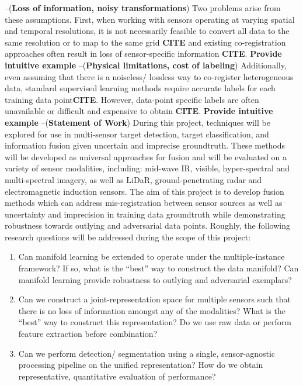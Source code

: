 \newline \vspace{1cm} \noindent --(\textbf{Loss of information, noisy transformations}) \newline
Two problems arise from these assumptions.  First, when working with sensors operating at varying spatial and temporal resolutions, it is not necessarily feasible to convert all data to the same resolution or to map to the same grid \textbf{CITE} and existing co-registration approaches often result in loss of sensor-specific information \textbf{CITE}.  \textbf{Provide intuitive example}   
\newline 
\vspace{1cm}\noindent --(\textbf{Physical limitations, cost of labeling}) \newline
Additionally, even assuming that there is a noiseless/ lossless way to co-register heterogeneous data, standard supervised learning methods require accurate labels for each training data point\textbf{CITE}.  However, data-point specific labels are often unavailable or difficult and expensive to obtain \textbf{CITE}. \textbf{Provide intuitive example} 
\newline
\vspace{1cm}\noindent --(\textbf{Statement of Work}) \newline
During this project, techniques will be explored for use in multi-sensor target detection, target classification, and information fusion given uncertain and imprecise groundtruth.  These methods will be developed as universal approaches for fusion and will be evaluated on a variety of sensor modalities, including: mid-wave IR, visible, hyper-spectral and multi-spectral imagery, as well as LiDaR, ground-penetrating radar and electromagnetic induction sensors.  The aim of this project is to develop fusion methods which can address mis-registration between sensor sources as well as uncertainty and imprecision in training data groundtruth while demonstrating robustness towards outlying and adversarial data points. Roughly, the following research questions will be addressed during the scope of this project:
\begin{enumerate}
	\item Can manifold learning be extended to operate under the multiple-instance framework? If so, what is the ``best'' way to construct the data manifold?  Can manifold learning provide robustness to outlying and adversarial exemplars?
	\item Can we construct a joint-representation space for multiple sensors such that there is no loss of information amongst any of the modalities?  What is the ``best'' way to construct this representation?  Do we use raw data or perform feature extraction before combination?
	\item Can we perform detection/ segmentation using a single, sensor-agnostic processing pipeline on the unified representation?  How do we obtain representative, quantitative evaluation of performance?
\end{enumerate} 

